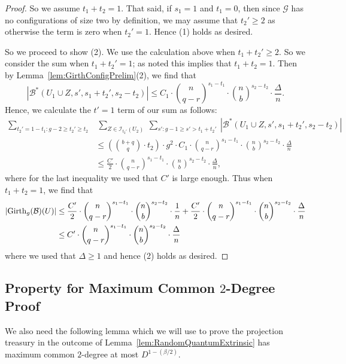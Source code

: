 \documentclass[11pt]{article}
\newcommand{\mc}[1]{\mathcal{#1}}
\newcounter{i}
\theoremstyle{plain}
\theoremstyle{plain} %
\theoremstyle{definition}
\begin{document}
\begin{proof}
So we assume $t_1+t_2=1$. That said, if $s_1=1$ and $t_1=0$, then since $\mc{G}$ has no configurations of size two by definition, we may assume that $t_2'\ge 2$ as otherwise the term is zero when $t_2'=1$. Hence (1) holds as desired.

So we proceed to show (2). We use the calculation above when $t_1+t_2'\ge 2$. So we consider the sum when $t_1+t_2'=1$; as noted this implies that $t_1+t_2=1$. Then by Lemma~\ref{lem:GirthConfigPrelim}(2), we find that
$$|\mc{B}^{*}(U_1\cup Z,s',s_1+t_2',s_2-t_2)| \le C_1\cdot \binom{n}{q-r}^{s_1-t_1} \cdot \binom{n}{b}^{s_2-t_2}\cdot \frac{\Delta}{n}.$$
Hence, we calculate the $t'=1$ term of our sum as follows:
\begin{align*}
\sum_{t_2'= 1-t_1: g-2\ge t_2' \ge t_2}&~\sum_{Z\in \mc{I}_{t_2'}(U_2)}~\sum_{s': g-1\ge s' > t_1+t_2'}~|\mc{B}^{*}(U_1\cup Z,s',s_1+t_2',s_2-t_2)| \\
&\le \left(\binom{b+q}{q}\cdot t_2\right) \cdot g^2 \cdot C_1\cdot \binom{n}{q-r}^{s_1-t_1} \cdot \binom{n}{b}^{s_2-t_2}\cdot \frac{\Delta}{n}\\
&\le \frac{C'}{2}\cdot \binom{n}{q-r}^{s_1-t_1} \cdot \binom{n}{b}^{s_2-t_2}\cdot \frac{\Delta}{n},
\end{align*}
where for the last inequality we used that $C'$ is large enough. 
Thus when $t_1+t_2=1$, we find that
\begin{align*}
|{\rm Girth}_g(\mc{B})(U)| &\le \frac{C'}{2} \cdot \binom{n}{q-r}^{s_1-t_1} \cdot \binom{n}{b}^{s_2-t_2}\cdot \frac{1}{n} + \frac{C'}{2}\cdot \binom{n}{q-r}^{s_1-t_1} \cdot \binom{n}{b}^{s_2-t_2}\cdot \frac{\Delta}{n} \\
&\le C'\cdot \binom{n}{q-r}^{s_1-t_1} \cdot \binom{n}{b}^{s_2-t_2}\cdot \frac{\Delta}{n}
\end{align*}
where we used that $\Delta \ge 1$ and hence (2) holds as desired. 
\end{proof}

\subsection{Property for Maximum Common $2$-Degree Proof}

We also need the following lemma which we will use to prove the projection treasury in the outcome of Lemma~\ref{lem:RandomQuantumExtrinsic} has maximum common $2$-degree at most $D^{1-(\beta/2)}$.
\end{document}
